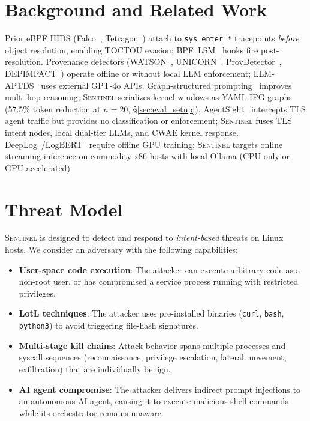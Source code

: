\documentclass[journal]{IEEEtran}
\newcommand{\sentinel}{\textsc{Sentinel}}
\newcommand{\ipg}{IPG}
\newcommand{\cwae}{CWAE}
\begin{document}
\section{Background and Related Work}\label{sec:background}

Prior eBPF HIDS (Falco~\cite{falco}, Tetragon~\cite{tetragon}) attach to
\texttt{sys\_enter\_*} tracepoints \emph{before} object resolution, enabling
TOCTOU evasion; BPF~LSM~\cite{bpf_lsm_kernel} hooks fire post-resolution.
Provenance detectors (WATSON~\cite{watson,watson2}, UNICORN~\cite{unicorn},
ProvDetector~\cite{provdetector}, DEPIMPACT~\cite{depimpact}) operate offline
or without local LLM enforcement; LLM-APTDS~\cite{llm_aptds} uses external
GPT-4o APIs.  Graph-structured prompting~\cite{kg_llm_threat} improves
multi-hop reasoning; \sentinel{} serializes kernel windows as YAML \ipg{} graphs
(57.5\% token reduction at $n{=}20$, \S\ref{sec:eval_setup}).
AgentSight~\cite{agentsight} intercepts TLS agent traffic but provides no
classification or enforcement; \sentinel{} fuses TLS intent nodes, local
dual-tier LLMs, and \cwae{} kernel response.
DeepLog~\cite{deeplog}/LogBERT~\cite{logbert} require offline GPU training;
\sentinel{} targets online streaming inference on commodity x86 hosts with
local Ollama (CPU-only or GPU-accelerated).

\section{Threat Model}\label{sec:threat}

\sentinel{} is designed to detect and respond to \emph{intent-based} threats
on Linux hosts.  We consider an adversary with the following capabilities:

\begin{itemize}
  \item \textbf{User-space code execution}: The attacker can execute arbitrary
        code as a non-root user, or has compromised a service process running
        with restricted privileges.
  \item \textbf{LotL techniques}: The attacker uses pre-installed binaries
        (\texttt{curl}, \texttt{bash}, \texttt{python3}) to avoid triggering
        file-hash signatures.
  \item \textbf{Multi-stage kill chains}: Attack behavior spans multiple
        processes and syscall sequences (reconnaissance, privilege escalation,
        lateral movement, exfiltration) that are individually benign.
  \item \textbf{AI agent compromise}: The attacker delivers indirect prompt
        injections to an autonomous AI agent, causing it to execute malicious
        shell commands while its orchestrator remains unaware.
\end{itemize}
\end{document}

